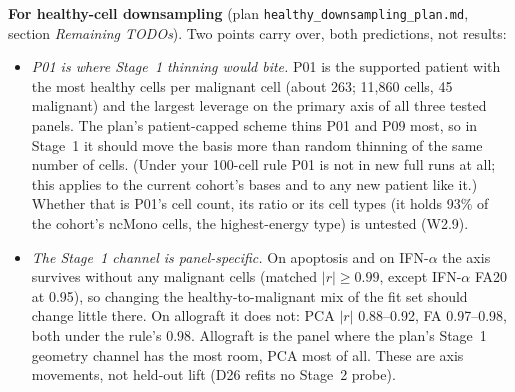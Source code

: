 \textbf{For healthy-cell downsampling} (plan \texttt{healthy\_downsampling\_plan.md}, section \emph{Remaining TODOs}). Two points carry over, both predictions, not results:
\begin{itemize}[leftmargin=1.4em]
\item \emph{P01 is where Stage~1 thinning would bite.} P01 is the supported patient with the most healthy cells per malignant cell (about 263; 11,860 cells, 45 malignant) and the largest leverage on the primary axis of all three tested panels. The plan's patient-capped scheme thins P01 and P09 most, so in Stage~1 it should move the basis more than random thinning of the same number of cells. (Under your 100-cell rule P01 is not in new full runs at all; this applies to the current cohort's bases and to any new patient like it.) Whether that is P01's cell count, its ratio or its cell types (it holds 93\% of the cohort's ncMono cells, the highest-energy type) is untested (W2.9).
\item \emph{The Stage~1 channel is panel-specific.} On apoptosis and on IFN-$\alpha$ the axis survives without any malignant cells (matched $|r| \geq 0.99$, except IFN-$\alpha$ FA20 at 0.95), so changing the healthy-to-malignant mix of the fit set should change little there. On allograft it does not: PCA $|r|$ 0.88--0.92, FA 0.97--0.98, both under the rule's 0.98. Allograft is the panel where the plan's Stage~1 geometry channel has the most room, PCA most of all. These are axis movements, not held-out lift (D26 refits no Stage~2 probe).
\end{itemize}


